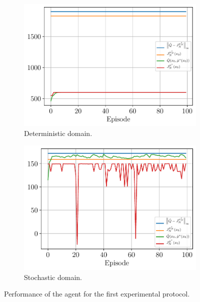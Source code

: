 \documentclass[a4paper, 12pt]{article}
\begin{document}
    \begin{figure}[h]
        \begin{subfigure}[b]{0.47\textwidth}
            \centering
            \includegraphics[width=\textwidth]{resources/pdf/5.2.3_deterministic.pdf}
            \caption{Deterministic domain.}
        \end{subfigure}
        \hfill
        \begin{subfigure}[b]{0.47\textwidth}
            \centering
            \includegraphics[width=\textwidth]{resources/pdf/5.2.3_stochastic.pdf}
            \caption{Stochastic domain.}
        \end{subfigure}
        \caption{Performance of the agent for the first experimental protocol.}
        \label{fig:ql.third.protocol}
    \end{figure}
    
\end{document}
